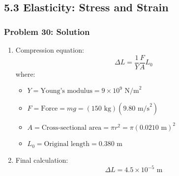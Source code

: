 \documentclass{beamer}
\begin{document}
\subsection{5.3 Elasticity: Stress and Strain}
\begin{frame}
\frametitle{Problem 30: Solution}
\begin{enumerate}
\item Compression equation:
    \[\Delta L = \frac{1}{Y} \frac{F}{A}L_0\]
    where:
    \begin{itemize}
    \item $Y = \text{Young's modulus} = 9 \times 10^9 \text{ N/m}^2$
    \item $F = \text{Force} = mg = (150 \text{ kg})(9.80 \text{ m/s}^2)$
    \item $A = \text{Cross-sectional area} = \pi r^2 = \pi(0.0210 \text{ m})^2$
    \item $L_0 = \text{Original length} = 0.380 \text{ m}$
    \end{itemize}
\item Final calculation:
    \[\Delta L = 4.5 \times 10^{-5} \text{ m}\]
\end{enumerate}
\end{frame}
\end{document}
